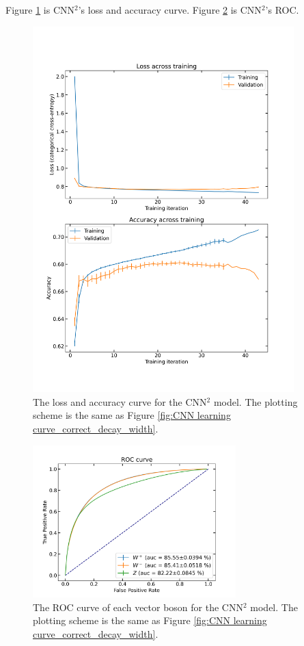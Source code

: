 \documentclass[12pt]{article}
\begin{document}
		Figure \ref{fig:CNNsq learning curve_correct_decay_width} is CNN${}^2$'s loss and accuracy curve. Figure \ref{fig:CNNsq roc curve_correct_decay_width} is CNN${}^2$'s ROC.
		\begin{figure}[htpb]
			\centering
			\includegraphics[width=0.90\textwidth]{CNNsq_loss_and_accuracy_correct_width.png}
			\caption{The loss and accuracy curve for the CNN$^2$ model. The plotting scheme is the same as Figure \ref{fig:CNN learning curve_correct_decay_width}.}
			\label{fig:CNNsq learning curve_correct_decay_width}
		\end{figure}
		\begin{figure}[htpb]
			\centering
			\includegraphics[width=0.70\textwidth]{CNNsq_roc_auc_correct_width.png}
			\caption{The ROC curve of each vector boson for the CNN$^2$ model. The plotting scheme is the same as Figure \ref{fig:CNN learning curve_correct_decay_width}.}
			\label{fig:CNNsq roc curve_correct_decay_width}
		\end{figure}
\end{document}

